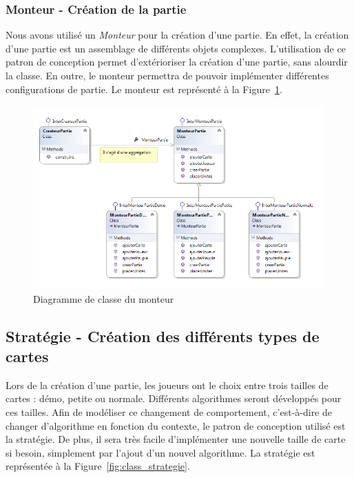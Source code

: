 \documentclass[a4paper]{article}%
\begin{document}
\subsubsection{Monteur - Création de la partie}

Nous avons utilisé un \textit{Monteur} pour la création d'une partie. En effet, la création d'une partie est un assemblage de différents objets complexes. L'utilisation de ce patron de conception permet d'extérioriser la création d'une partie, sans alourdir la classe.
En outre, le monteur permettra de pouvoir implémenter différentes configurations de partie. Le monteur est représenté à la Figure~\ref{fig:class_monteur}.

\begin{figure}[H]
    \centering
    \includegraphics[width=\textwidth]{./images/classe/monteur.png}
		\caption{Diagramme de classe du monteur}
		\label{fig:class_monteur}
\end{figure}


\subsection{Stratégie - Création des différents types de cartes}

Lors de la création d'une partie, les joueurs ont le choix entre trois tailles de cartes : démo, petite ou normale. Différents algorithmes seront développés pour ces tailles. Afin de modéliser ce changement de comportement, c'est-à-dire de changer d'algorithme en fonction du contexte, le patron de conception utilisé est la stratégie. De plus, il sera très facile d'implémenter une nouvelle taille de carte si besoin, simplement par l'ajout d'un nouvel algorithme. La stratégie est représentée à la Figure~\ref{fig:class_strategie}.
\end{document}
